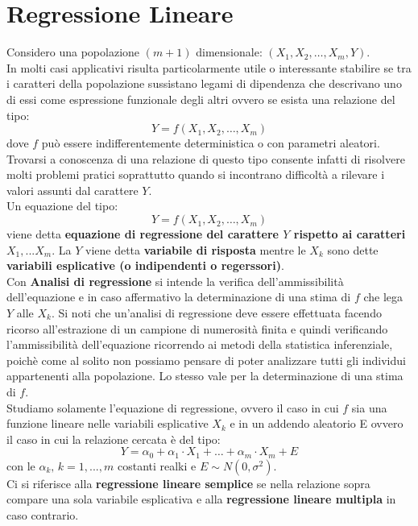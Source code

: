 \documentclass[a4paper,12pt, oneside]{book}
\begin{document}
\chapter{Regressione Lineare}
Considero una popolazione $(m+1)$ dimensionale: $\left(X_{1}, X_{2}, \ldots, X_{m}, Y\right)$.\\
In molti casi applicativi risulta particolarmente utile o interessante stabilire se tra i
caratteri della popolazione sussistano legami di dipendenza che descrivano uno di
essi come espressione funzionale degli altri ovvero se esista una relazione del tipo:
\[Y=f\left(X_{1}, X_{2}, \ldots, X_{m}\right)\]
dove $f$ può essere indifferentemente deterministica o con parametri aleatori.\\
Trovarsi a conoscenza di una relazione di questo tipo consente infatti di risolvere
molti problemi pratici soprattutto quando si incontrano difficoltà a rilevare i valori
assunti dal carattere $Y$.\\
Un equazione del tipo:
\[Y=f\left(X_{1}, X_{2}, \ldots, X_{m}\right)\]
viene detta \textbf{equazione di regressione del carattere $Y$ rispetto ai caratteri $X_1,...X_m$}. La $Y$ viene detta \textbf{variabile di risposta} mentre le $X_k$ sono dette \textbf{variabili esplicative (o indipendenti o regerssori)}.\\
Con \textbf{Analisi di regressione} si intende la verifica dell'ammissibilità dell'equazione e in caso affermativo la determinazione di una stima di $f$ che lega $Y$ alle $X_k$. Si noti che un’analisi di regressione deve essere effettuata facendo ricorso
all’estrazione di un campione di numerosità finita e quindi verificando l’ammissibilità dell'equazione ricorrendo ai metodi della statistica inferenziale, poichè come al solito non possiamo
pensare di poter analizzare tutti gli individui appartenenti alla popolazione. Lo stesso
vale per la determinazione di una stima di $f$.\\
Studiamo solamente l'equazione di regressione, ovvero il caso in cui $f$ sia una funzione lineare nelle variabili esplicative $X_k$ e in un
addendo aleatorio E ovvero il caso in cui la relazione cercata è del tipo:
\[Y=\alpha_{0}+\alpha_{1} \cdot X_{1}+\ldots+\alpha_{m} \cdot X_{m}+E\]
con le $\alpha_k,\, k=1,...,m$ costanti realki e $E\sim N(0,\sigma^2)$.\\
Ci si riferisce alla \textbf{regressione lineare semplice} se nella relazione sopra compare una sola variabile
esplicativa e alla \textbf{regressione lineare multipla} in caso contrario.\\
\end{document}
